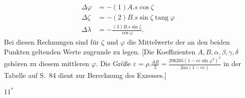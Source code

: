 \[
\begin{aligned}
\Delta\varphi&=-(1)A.s\cos\zeta\\
\Delta\zeta&=-(2)B.s\sin\zeta\operatorname{tang}\varphi\\
\Delta\lambda&=-\frac{(3)B.s\sin\zeta}{\cos\varphi}.
\end{aligned}
\]
Bei diesen Rechnungen sind für \(\zeta\) und \(\varphi\) die Mittelwerte der an den
beiden Punkten geltenden Werte zugrunde zu legen. [Die Koeffizienten
\(A,B,\alpha,\beta,\gamma,\delta\) gehören zu diesem mittleren \(\varphi\). Die Größe
\(\varepsilon=\rho.\frac{AB}{2}=\frac{206265(1-ee\sin\varphi^2)^2}{2aa(1-ee)}\)
in der Tabelle auf S.~84 dient zur Berechnung des Exzesses.]
\par\smallskip\noindent\hfill\(11^*\)\hspace{.12\textwidth}\par

